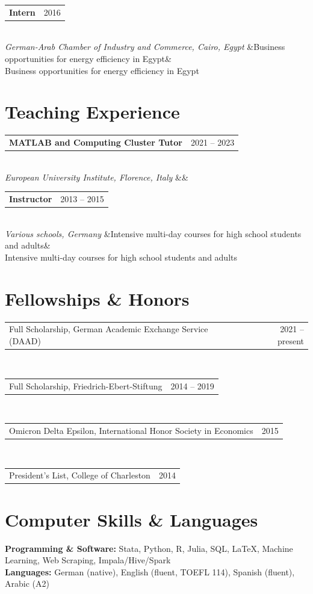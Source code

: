 \documentclass[11pt,a4paper]{article}
\makeatletter
\newcommand{\daterow}[2]{%
  \begin{tabularx}{\textwidth}{@{}X r@{}}
    #1 & #2
  \end{tabularx}%
}
\newcommand{\entry}[4]{%
  \daterow{\textbf{#1}}{#3}\\[1pt]
  \textit{#2}%
  \ifx&#4&%
  \else
    \\[1pt]#4%
  \fi
  \vspace{0.6em}
}
\makeatother
\begin{document}
\entry{Intern}{German-Arab Chamber of Industry and Commerce, Cairo, Egypt}{2016}{Business opportunities for energy efficiency in Egypt}

\section{Teaching Experience}

\entry{MATLAB and Computing Cluster Tutor}{European University Institute, Florence, Italy}{2021 -- 2023}{}

\entry{Instructor}{Various schools, Germany}{2013 -- 2015}{Intensive multi-day courses for high school students and adults}

\section{Fellowships \& Honors}

\daterow{Full Scholarship, German Academic Exchange Service (DAAD)}{2021 -- present}\\[0.4em]
\daterow{Full Scholarship, Friedrich-Ebert-Stiftung}{2014 -- 2019}\\[0.4em]
\daterow{Omicron Delta Epsilon, International Honor Society in Economics}{2015}\\[0.4em]
\daterow{President's List, College of Charleston}{2014}

\section{Computer Skills \& Languages}

\textbf{Programming \& Software:} Stata, Python, R, Julia, SQL, \LaTeX, Machine Learning, Web Scraping, Impala/Hive/Spark\\[0.4em]
\textbf{Languages:} German (native), English (fluent, TOEFL 114), Spanish (fluent), Arabic (A2)

\end{document}
